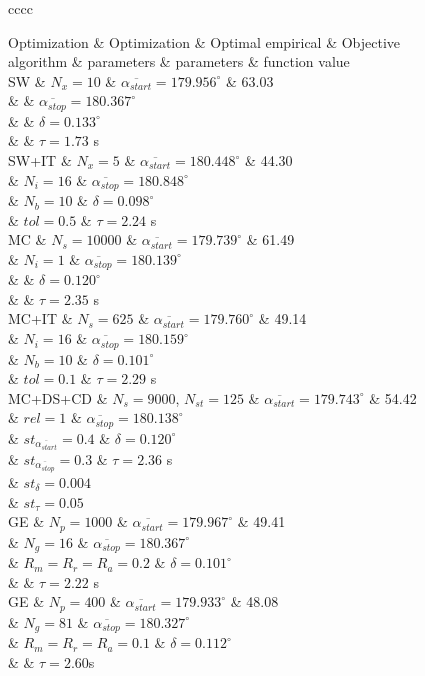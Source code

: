 \documentclass[review,authoryear]{elsarticle}
\newcommand{\TABLE}[5]
{
	\begin{table}[ht!]
		\centering
		\caption{#4.\label{#5}}
		#1
		\tabulinesep=0.9mm
		\begin{tabu}{#2}
			#3
		\end{tabu}
	\end{table}
}
\begin{document}
\TABLE{\footnotesize}{cccc}
{
	Optimization & Optimization & Optimal empirical & Objective
	\\ algorithm & parameters & parameters & function value
	\\ \hline
	SW & $N_x=10$ & $\overline{\alpha_{start}}=179.956^\circ$
	& 63.03
	\\ & & $\overline{\alpha_{stop}}=180.367^\circ$
	\\ & & $\delta=0.133^\circ$
	\\ & & $\tau=1.73$ s
	\\ \hline
	SW+IT & $N_x=5$ & $\overline{\alpha_{start}}=180.448^\circ$
	& 44.30
	\\ & $N_i=16$ & $\overline{\alpha_{stop}}=180.848^\circ$
	\\ & $N_b=10$ & $\delta=0.098^\circ$
	\\ & $tol=0.5$ & $\tau=2.24$ s
	\\ \hline
	MC & $N_s=10000$
	& $\overline{\alpha_{start}}=179.739^\circ$ & 61.49
	\\ & $N_i=1$ & $\overline{\alpha_{stop}}=180.139^\circ$
	\\ & & $\delta=0.120^\circ$
	\\ & & $\tau=2.35$ s
	\\ \hline
	MC+IT & $N_s=625$
	& $\overline{\alpha_{start}}=179.760^\circ$ & 49.14
	\\ & $N_i=16$ & $\overline{\alpha_{stop}}=180.159^\circ$
	\\ & $N_b=10$ & $\delta=0.101^\circ$
	\\ & $tol=0.1$ & $\tau=2.29$ s
	\\ \hline
	MC+DS+CD & $N_s=9000$, $N_{st}=125$
	& $\overline{\alpha_{start}}=179.743^\circ$ & 54.42
	\\ & $rel=1$ & $\overline{\alpha_{stop}}=180.138^\circ$
	\\ & $st_{\overline{\alpha_{start}}}=0.4$ & $\delta=0.120^\circ$
	\\ & $st_{\overline{\alpha_{stop}}}=0.3$ & $\tau=2.36$ s
	\\ & $st_\delta=0.004$
	\\ & $st_\tau=0.05$
	\\ \hline
	GE & $N_p=1000$ & $\overline{\alpha_{start}}=179.967^\circ$
	& 49.41
	\\ & $N_g=16$ & $\overline{\alpha_{stop}}=180.367^\circ$
	\\ & $R_m=R_r=R_a=0.2$ & $\delta=0.101^\circ$
	\\ & & $\tau=2.22$ s
	\\ \hline
	GE & $N_p=400$ & $\overline{\alpha_{start}}=179.933^\circ$
	& 48.08
	\\ & $N_g=81$ & $\overline{\alpha_{stop}}=180.327^\circ$
	\\ & $R_m=R_r=R_a=0.1$ & $\delta=0.112^\circ$
	\\ & & $\tau=2.60$s
	\\ \hline
}{Optimal parameters and values of the evaluation function in the four towers pivot case in \citet{Ouazaa15} using different optimization algorithms implemented in MPCOTool with the same number of total simulations ($N_{total}=10000$). $N_x$ is the sweeps number for every variable in SW}{TabPivot}
\end{document}
